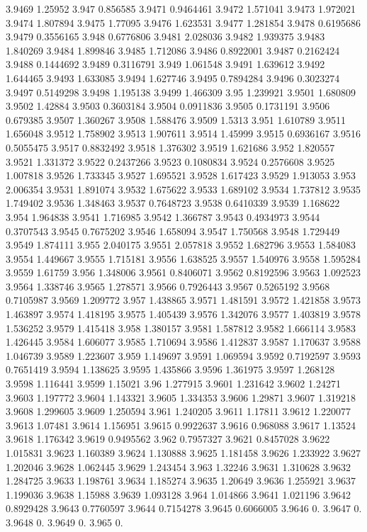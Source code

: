3.9469  1.25952
3.947  0.856585
3.9471  0.9464461
3.9472  1.571041
3.9473  1.972021
3.9474  1.807894
3.9475  1.77095
3.9476  1.623531
3.9477  1.281854
3.9478  0.6195686
3.9479  0.3556165
3.948  0.6776806
3.9481  2.028036
3.9482  1.939375
3.9483  1.840269
3.9484  1.899846
3.9485  1.712086
3.9486  0.8922001
3.9487  0.2162424
3.9488  0.1444692
3.9489  0.3116791
3.949  1.061548
3.9491  1.639612
3.9492  1.644465
3.9493  1.633085
3.9494  1.627746
3.9495  0.7894284
3.9496  0.3023274
3.9497  0.5149298
3.9498  1.195138
3.9499  1.466309
3.95  1.239921
3.9501  1.680809
3.9502  1.42884
3.9503  0.3603184
3.9504  0.0911836
3.9505  0.1731191
3.9506  0.679385
3.9507  1.360267
3.9508  1.588476
3.9509  1.5313
3.951  1.610789
3.9511  1.656048
3.9512  1.758902
3.9513  1.907611
3.9514  1.45999
3.9515  0.6936167
3.9516  0.5055475
3.9517  0.8832492
3.9518  1.376302
3.9519  1.621686
3.952  1.820557
3.9521  1.331372
3.9522  0.2437266
3.9523  0.1080834
3.9524  0.2576608
3.9525  1.007818
3.9526  1.733345
3.9527  1.695521
3.9528  1.617423
3.9529  1.913053
3.953  2.006354
3.9531  1.891074
3.9532  1.675622
3.9533  1.689102
3.9534  1.737812
3.9535  1.749402
3.9536  1.348463
3.9537  0.7648723
3.9538  0.6410339
3.9539  1.168622
3.954  1.964838
3.9541  1.716985
3.9542  1.366787
3.9543  0.4934973
3.9544  0.3707543
3.9545  0.7675202
3.9546  1.658094
3.9547  1.750568
3.9548  1.729449
3.9549  1.874111
3.955  2.040175
3.9551  2.057818
3.9552  1.682796
3.9553  1.584083
3.9554  1.449667
3.9555  1.715181
3.9556  1.638525
3.9557  1.540976
3.9558  1.595284
3.9559  1.61759
3.956  1.348006
3.9561  0.8406071
3.9562  0.8192596
3.9563  1.092523
3.9564  1.338746
3.9565  1.278571
3.9566  0.7926443
3.9567  0.5265192
3.9568  0.7105987
3.9569  1.209772
3.957  1.438865
3.9571  1.481591
3.9572  1.421858
3.9573  1.463897
3.9574  1.418195
3.9575  1.405439
3.9576  1.342076
3.9577  1.403819
3.9578  1.536252
3.9579  1.415418
3.958  1.380157
3.9581  1.587812
3.9582  1.666114
3.9583  1.426445
3.9584  1.606077
3.9585  1.710694
3.9586  1.412837
3.9587  1.170637
3.9588  1.046739
3.9589  1.223607
3.959  1.149697
3.9591  1.069594
3.9592  0.7192597
3.9593  0.7651419
3.9594  1.138625
3.9595  1.435866
3.9596  1.361975
3.9597  1.268128
3.9598  1.116441
3.9599  1.15021
3.96  1.277915
3.9601  1.231642
3.9602  1.24271
3.9603  1.197772
3.9604  1.143321
3.9605  1.334353
3.9606  1.29871
3.9607  1.319218
3.9608  1.299605
3.9609  1.250594
3.961  1.240205
3.9611  1.17811
3.9612  1.220077
3.9613  1.07481
3.9614  1.156951
3.9615  0.9922637
3.9616  0.968088
3.9617  1.13524
3.9618  1.176342
3.9619  0.9495562
3.962  0.7957327
3.9621  0.8457028
3.9622  1.015831
3.9623  1.160389
3.9624  1.130888
3.9625  1.181458
3.9626  1.233922
3.9627  1.202046
3.9628  1.062445
3.9629  1.243454
3.963  1.32246
3.9631  1.310628
3.9632  1.284725
3.9633  1.198761
3.9634  1.185274
3.9635  1.20649
3.9636  1.255921
3.9637  1.199036
3.9638  1.15988
3.9639  1.093128
3.964  1.014866
3.9641  1.021196
3.9642  0.8929428
3.9643  0.7760597
3.9644  0.7154278
3.9645  0.6066005
3.9646  0.
3.9647  0.
3.9648  0.
3.9649  0.
3.965  0.
